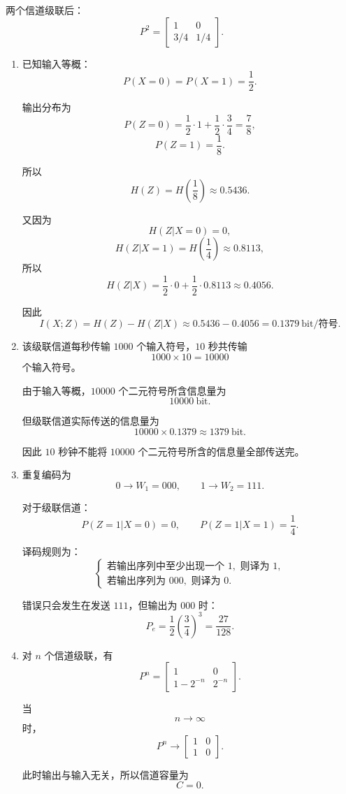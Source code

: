 \documentclass[UTF8,a4paper,12pt]{ctexart}
\begin{document}
两个信道级联后：
\[
P^2=
\begin{bmatrix}
1&0\\
3/4&1/4
\end{bmatrix}.
\]

\begin{enumerate}[label=\arabic*., leftmargin=2em]
\item 已知输入等概：
\[
P(X=0)=P(X=1)=\frac12.
\]

输出分布为
\[
P(Z=0)=\frac12\cdot 1+\frac12\cdot \frac34=\frac78,
\]
\[
P(Z=1)=\frac18.
\]

所以
\[
H(Z)=H\left(\frac18\right)\approx 0.5436.
\]

又因为
\[
H(Z|X=0)=0,
\]
\[
H(Z|X=1)=H\left(\frac14\right)\approx 0.8113,
\]
所以
\[
H(Z|X)=\frac12\cdot 0+\frac12\cdot 0.8113
\approx 0.4056.
\]

因此
\[
I(X;Z)=H(Z)-H(Z|X)
\approx 0.5436-0.4056
=0.1379\ \text{bit/符号}.
\]

\item 该级联信道每秒传输 $1000$ 个输入符号，$10$ 秒共传输
\[
1000\times 10=10000
\]
个输入符号。

由于输入等概，$10000$ 个二元符号所含信息量为
\[
10000\ \text{bit}.
\]

但级联信道实际传送的信息量为
\[
10000\times 0.1379\approx 1379\ \text{bit}.
\]

因此 $10$ 秒钟不能将 $10000$ 个二元符号所含的信息量全部传送完。

\item 重复编码为
\[
0\to W_1=000,\qquad 1\to W_2=111.
\]

对于级联信道：
\[
P(Z=1|X=0)=0,\qquad P(Z=1|X=1)=\frac14.
\]

译码规则为：
\[
\begin{cases}
\text{若输出序列中至少出现一个 }1,\text{ 则译为 }1,\\
\text{若输出序列为 }000,\text{ 则译为 }0.
\end{cases}
\]

错误只会发生在发送 $111$，但输出为 $000$ 时：
\[
P_e=\frac12\left(\frac34\right)^3
=\frac{27}{128}.
\]

\item 对 $n$ 个信道级联，有
\[
P^n=
\begin{bmatrix}
1&0\\
1-2^{-n}&2^{-n}
\end{bmatrix}.
\]

当
\[
n\to\infty
\]
时，
\[
P^n\to
\begin{bmatrix}
1&0\\
1&0
\end{bmatrix}.
\]

此时输出与输入无关，所以信道容量为
\[
C=0.
\]
\end{enumerate}
\end{document}
